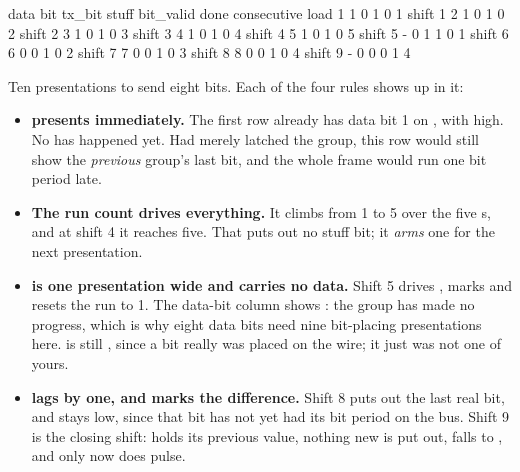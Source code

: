 \begin{textdrawing}
         data bit  tx_bit  stuff  bit_valid  done  consecutive
load            1       1      0          1     0            1
shift 1         2       1      0          1     0            2
shift 2         3       1      0          1     0            3
shift 3         4       1      0          1     0            4
shift 4         5       1      0          1     0            5
shift 5         -       0      1          1     0            1
shift 6         6       0      0          1     0            2
shift 7         7       0      0          1     0            3
shift 8         8       0      0          1     0            4
shift 9         -       0      0          0     1            4
\end{textdrawing}

Ten presentations to send eight bits. Each of the four rules shows up in it:
\begin{itemize}
  \item \textbf{ presents immediately.} The first row already has data bit 1 on
    , with  high. No  has happened yet. Had 
    merely latched the group, this row would still show the \emph{previous} group's last bit, and the
    whole frame would run one bit period late.
  \item \textbf{The run count drives everything.} It climbs from 1 to 5 over the five s,
    and at shift 4 it reaches five. That puts out no stuff bit; it \emph{arms} one for the next
    presentation.
  \item \textbf{ is one presentation wide and carries no data.} Shift 5 drives
    , marks  and resets the run to 1. The data-bit column shows
    \code{-}: the group has made no progress, which is why eight data bits need nine bit-placing
    presentations here.  is still , since a bit really was placed on the
    wire; it just was not one of yours.
  \item \textbf{ lags by one, and  marks the difference.} Shift 8 puts out
    the last real bit, and  stays low, since that bit has not yet had its bit period on
    the bus. Shift 9 is the closing shift:  holds its previous value, nothing new is put
    out,  falls to , and only now does  pulse.
\end{itemize}

